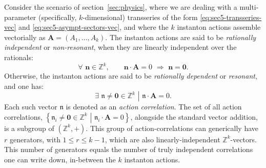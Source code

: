 \documentclass[11pt,a4paper]{article}
\def\BZ{{\mathbb Z}}
\newcommand{\be}{\begin{equation}}
\newcommand{\ee}{\end{equation}}
\begin{document}
Consider the scenario of section~\ref{sec:physics}, where we are dealing with a multi-parameter (specifically, $k$-dimensional) transseries of the form \eqref{eq:sec5-transseries-vec} and \eqref{eq:sec5-asympt-sectors-vec}, and where the $k$ instanton actions assemble vectorially as $\boldsymbol{A} = \left( A_1, \ldots, A_k \right)$. The instanton actions are said to be \textit{rationally independent} or \textit{non-resonant}, when they are linearly independent over the rationals:
%
\be
\forall \,\, \boldsymbol{n} \in \BZ^k, \qquad \boldsymbol{n} \cdot \boldsymbol{A} = 0 \,\, \Rightarrow \,\, \boldsymbol{n}=\boldsymbol{0}.
\ee
%
\noindent
Otherwise, the instanton actions are said to be \textit{rationally dependent} or \textit{resonant}, and one has:
%
\be
\label{rationally-dependent-resonant-actions}
\left. \exists \,\, \boldsymbol{\mathfrak{n}} \neq \boldsymbol{0} \in \BZ^k \,\, \right| \,\, \boldsymbol{\mathfrak{n}} \cdot \boldsymbol{A} = 0.
\ee
%
\noindent
Each such vector $\boldsymbol{\mathfrak{n}}$ is denoted as an \textit{action correlation}. The set of all action correlations, $\left. \left\{ \boldsymbol{\mathfrak{n}}_i \neq \boldsymbol{0} \in \BZ^k \,\,\right|\,\, \boldsymbol{\mathfrak{n}}_i \cdot \boldsymbol{A} = 0 \right\}$, alongside the standard vector addition, is a subgroup of $\left( \BZ^k, + \right)$. This group of action-correlations can generically have $r$ generators, with $1 \leq r \leq k-1$, which are also linearly-independent $\BZ^k$-vectors. This number of generators equals the number of truly independent correlations one can write down, in-between the $k$ instanton actions.
\end{document}
